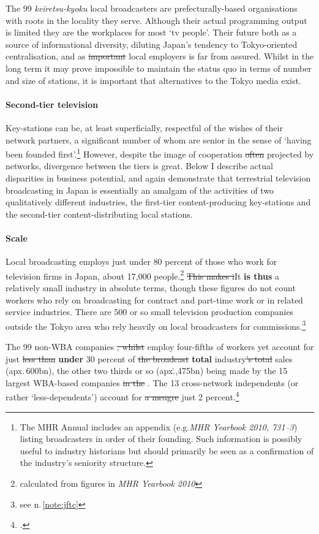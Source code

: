\documentclass[11pt, oneside, a4paper, headsepline]{scrartcl}
\newcommand{\citej}[2] {\footcite[\nopp #1]{#2} }
\newcommand{\ty}{\textyen}
\begin{document}
The 99 \emph{keiretsu-kyoku} local broadcasters are prefecturally-based organisations with roots in the locality they serve. Although their actual programming output is limited they are the workplaces for most `tv people'. Their future both as a source of informational diversity, diluting Japan's tendency to Tokyo-oriented centralisation, and as \st{important} local employers is far from assured. Whilst in the long term it may prove impossible to maintain the status quo in terms of number and size of stations, it is important that alternatives to the Tokyo media exist. 

\paragraph{Second-tier television} 
Key-stations can be, at least superficially, respectful of the wishes of their network partners, a significant number of whom are senior in the sense of `having been founded first'.\footnote{The MHR Annual includes an appendix (e.g.\textit{MHR Yearbook 2010, 731--3}) listing broadcasters in order of their founding. Such information is possibly useful to industry historians but should primarily be seen as a confirmation of the industry's seniority structure.}  However, despite the image of cooperation \st{often} projected by networks, divergence between the tiers is great. Below I describe actual disparities in business potential, and again demonstrate that terrestrial television broadcasting in Japan is essentially an amalgam of the activities of two qualitatively different industries, the first-tier content-producing key-stations and the second-tier content-distributing local stations.

\paragraph{Scale} \label{scale} Local broadcasting employs just under 80 percent of those who work for television firms in Japan, about 17,000 people.\footnote{calculated from figures in \emph{MHR Yearbook 2010}} \st{This makes i}It \textbf{is thus} a relatively small industry in absolute terms, though these figures do not count workers who rely on broadcasting for contract and part-time work or in related service industries. There are 500 or so small television production companies outside the Tokyo area who rely heavily on local broadcasters for commissions.\footnote{see n.\,\ref{note:jftc}}

The 99 non-WBA companies \st{, whilst }employ four-fifths of workers yet account for just \st{less than} \textbf{under} 30 percent of \st{the broadcast} \textbf{total} industry\st{'s total} sales (apx.\,\ty600bn), the other two thirds or so (apx.\.\ty1,475bn) being made by the 15 largest WBA-based companies\st{ in the }. The 13 cross-network independents (or rather `less-dependents') account for \st{a meagre }just 2 percent.\citej{132}{JMH:2011}
\end{document}
